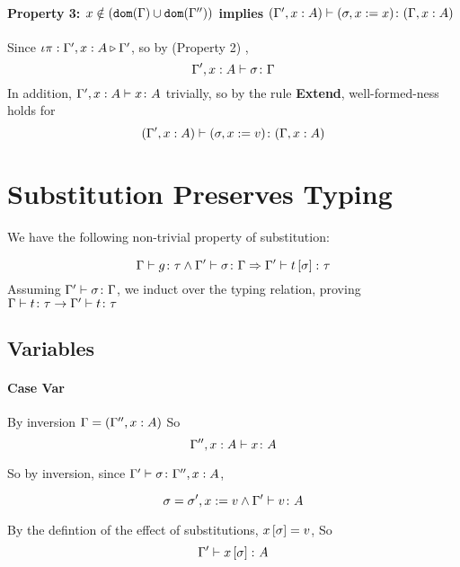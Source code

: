 {        \paragraph{Property 3: $x \notin (\texttt{dom}(\Gamma) \cup \texttt{dom}(\Gamma''))$ implies $(\Gamma', x: A) \vdash (\sigma, x := x) \colon (\Gamma, x: A)$} 
        Since $\iota\pi : \Gamma',x: A \triangleright \Gamma'$, so by (Property 2) , 
        $$\Gamma', x: A \vdash \sigma \colon \Gamma$$
        In addition, $\Gamma', x: A \vdash x \colon A$ trivially, so by the rule \textbf{Extend}, well-formed-ness holds for
        \begin{equation}
            (\Gamma', x:A) \vdash (\sigma, x:= v) \colon (\Gamma, x: A)
        \end{equation}
    

    \section{Substitution Preserves Typing}
    We have the following non-trivial property of substitution:

    \begin{equation}
        \Gamma \vdash g \colon \tau\wedge\Gamma' \vdash \sigma \colon \Gamma\Rightarrow\Gamma' \vdash t\left[\sigma\right] \colon \tau
    \end{equation}
    Assuming $\Gamma' \vdash \sigma \colon \Gamma$, we induct over the typing relation, proving $\Gamma \vdash t \colon \tau\rightarrow\Gamma' \vdash t \colon \tau$

    \subsection{Variables}  
        \paragraph{Case Var}
            By inversion $\Gamma = (\Gamma'', x:A)$
            So \begin{equation}
                \Gamma'',x:A \vdash x \colon A
            \end{equation}

            So by inversion, since $\Gamma' \vdash \sigma \colon \Gamma'', x:A$, 

            \begin{equation}
                \sigma = \sigma', x:= v \wedge \Gamma' \vdash v \colon A
            \end{equation}

            By the defintion of the effect of substitutions, $x\left[\sigma\right] = v$, So
            \begin{equation}
                \Gamma' \vdash x\left[\sigma\right] \colon A
            \end{equation}

}
